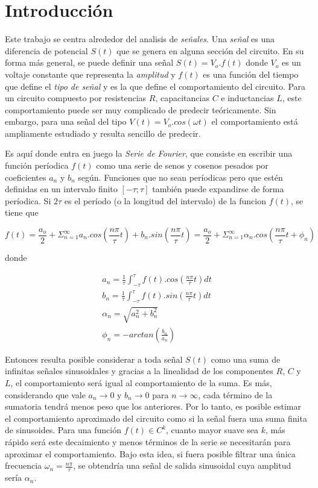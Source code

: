 \documentclass[11pt,a4paper]{article}
\begin{document}
\section{Introducción}\label{sec:intro}
Este trabajo se centra alrededor del analisis de \textit{señales}. Una \textit{señal} es una diferencia de potencial $S(t)$ que se genera en alguna sección del circuito. En su forma más general, se puede definir una señal $S(t) = V_o.f(t)$ donde $V_o$ es un voltaje constante que representa la \textit{amplitud} y $f(t)$ es una función del tiempo que define el \textit{tipo de señal} y es la que define el comportamiento del circuito. Para un circuito compuesto por resistencias $R$, capacitancias $C$ e inductancias $L$, este comportamiento puede ser muy complicado de predecir teóricamente. Sin embargo, para una señal del tipo $V(t) = V_o.cos(\omega t)$ el comportamiento está ampliamente estudiado y resulta sencillo de predecir. 

Es aquí donde entra en juego la \textit{Serie de Fourier}, que consiste en escribir una función períodica $f(t)$ como una serie de senos y cosenos pesados por coeficientes $a_n$ y $b_n$ según. Funciones que no sean períodicas pero que estén definidas en un intervalo finito $[-\tau;\tau]$ también puede expandirse de forma períodica. Si $2\tau$ es el período (o la longitud del intervalo) de la funcion $f(t)$, se tiene que

\begin{equation}
f(t) = \frac{a_o}{2} + \Sigma_{n=1}^{\infty} a_n.cos(\frac{n\pi}{\tau}t) + b_n.sin(\frac{n\pi}{\tau}t) = \frac{a_o}{2} + \Sigma_{n=1}^{\infty} \alpha_n.cos(\frac{n\pi}{\tau}t+\phi_n)
\label{eq:fourier}
\end{equation}

donde 

\begin{equation}
\begin{split}
a_n = \frac{1}{\tau}\int_{-\tau}^{\tau}f(t).cos(\frac{n\pi}{\tau}t)dt\\
b_n = \frac{1}{\tau}\int_{-\tau}^{\tau}f(t).sin(\frac{n\pi}{\tau}t)dt\\
\alpha_n = \sqrt{a_n^2+b_n^2}\\
\phi_n = -arctan(\frac{b_n}{a_n})
\end{split}
\label{eq:coefs}
\end{equation}

Entonces resulta posible considerar a toda señal $S(t)$ como una suma de infinitas señales sinusoidales y gracias a la linealidad de los componentes $R$, $C$ y $L$, el comportamiento será igual al comportamiento de la suma. Es más, considerando que vale $a_n \rightarrow 0$ y $b_n \rightarrow 0$ para $n \rightarrow \infty$, cada término de la sumatoria tendrá menos peso que los anteriores. Por lo tanto, es posible estimar el comportamiento aproximado del circuito como si la señal fuera una suma finita de sinusoides. Para una función $f(t)\in C^k$, cuanto mayor suave sea $k$, más rápido será este decaimiento y menos términos de la serie se necesitarán para aproximar el comportamiento. Bajo esta idea, si fuera posible filtrar una única frecuencia $\omega_n = \frac{n\pi}{\tau}$, se obtendría una señal de salida sinusoidal cuya amplitud sería $\alpha_n$. 
\end{document}
